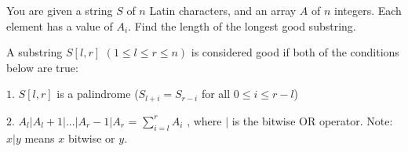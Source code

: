 You are given a string $S$ of $n$ Latin characters, and an array $A$ of $n$ integers. Each element has a value of $A_i$. Find the length of the longest good substring.

A substring $S[l, r]$ $(1 ≤ l ≤ r ≤ n)$ is considered good if both of the conditions below are true:

$1.$ $S[l, r]$ is a palindrome ($S_{l+i} = S_{r−i}$ for all $0 ≤ i ≤ r − l$)


$2.$ $A_l
|A_l +1|...|A_r −1|A_r $ = $\sum_{i = l}^r A_i$
, where $|$ is the bitwise OR operator.
Note: $x|y$ means $x$ bitwise or $y$.